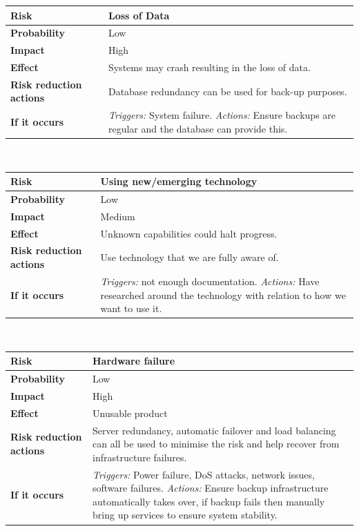 \noindent
\begin{tabular}{|l || p{10.3cm}|}
\hline
\textbf{Risk} & Loss of Data \\ \hline
\textbf{Probability} & Low \\ \hline
\textbf{Impact} & High \\ \hline
\textbf{Effect} & Systems may crash resulting in the loss of data.\\ \hline
\textbf{Risk reduction actions} & Database redundancy can be used for back-up purposes. \\ \hline
\textbf{If it occurs} &  \emph{Triggers:} System failure.  \emph{Actions:} Ensure backups are regular and the database can provide this.\\ 
\hline
\end{tabular}\\
\vspace{0.5cm}

\noindent
\begin{tabular}{|l || p{10.3cm}|}
\hline
\textbf{Risk} & Using new/emerging technology \\ \hline
\textbf{Probability} & Low \\ \hline
\textbf{Impact} & Medium \\ \hline
\textbf{Effect} & Unknown capabilities could halt progress.\\ \hline
\textbf{Risk reduction actions} & Use technology that we are fully aware of. \\ \hline
\textbf{If it occurs} &  \emph{Triggers:} not enough documentation.  \emph{Actions:} Have researched around the technology with relation to how we want to use it.\\ 
\hline
\end{tabular}\\
\vspace{0.5cm}

\noindent
\begin{tabular}{|l || p{10.3cm}|}
\hline
\textbf{Risk} & Hardware failure\\ \hline
\textbf{Probability} & Low \\ \hline
\textbf{Impact} & High \\ \hline
\textbf{Effect} & Unusable product\\ \hline
\textbf{Risk reduction actions} & Server redundancy, automatic failover and load balancing can all be used to minimise the risk and help recover from infrastructure failures. \\ \hline
\textbf{If it occurs} &  \emph{Triggers:} Power failure, DoS attacks, network issues, software failures.  \emph{Actions:} Ensure backup infrastructure automatically takes over, if backup fails then manually bring up services to ensure system stability.\\ 
\hline
\end{tabular}\\
\vspace{0.5cm}

